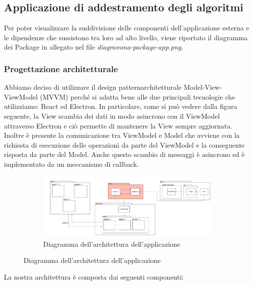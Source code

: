 \subsection{Applicazione di addestramento degli algoritmi}
Per poter visualizzare la suddivisione delle componenti dell'applicazione esterna e le dipendenze che sussistono tra loro ad alto livello, viene riportato il diagramma dei Package in allegato nel file \textit{diagramma-package-app.png}.
	\subsubsection{Progettazione architetturale}
	Abbiamo deciso di utilizzare il design pattern\glosp architetturale Model-View-ViewModel (MVVM) perché si adatta bene alle due principali tecnologie che utilizziamo: React ed Electron. In particolare, come si può vedere dalla figura seguente, la View scambia dei dati in modo asincrono con il ViewModel attraverso Electron e ciò permette di mantenere la View sempre aggiornata. Inoltre è presente la comunicazione tra ViewModel e Model che avviene con la richiesta di esecuzione delle operazioni da parte del ViewModel e la conseguente risposta da parte del Model. Anche questo scambio di messaggi è asincrono ed è implementato da un meccanismo di callback\glo.
	\mbox{}
	\begin{landscape}
		\begin{figure}
			\begin{figure} [H]
				\includegraphics[width=\linewidth]{./img/Diagrammi/architettura-app.png}
				\caption{Diagramma dell'architettura dell'applicazione}
			\end{figure}
		\end{figure}
	\end{landscape}
	La nostra architettura è composta dai seguenti componenti: 
